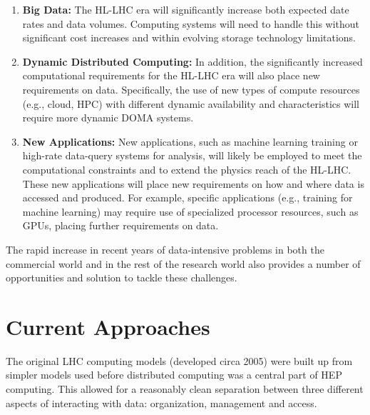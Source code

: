 \documentclass[12pt,a4paper]{article}
\begin{document}
\begin{enumerate}
\def\labelenumi{\arabic{enumi}.}
\item \textbf{Big Data:} The HL-LHC era will significantly increase both expected
  date rates and data volumes. Computing systems will need to
  handle this without significant cost increases and within evolving
  storage technology limitations.
\item \textbf{Dynamic Distributed Computing:} In addition, the significantly
  increased computational requirements for the HL-LHC era will also
  place new requirements on data. Specifically, the use of new types of
  compute resources (e.g., cloud, HPC) with different dynamic
  availability and characteristics will require more dynamic
  DOMA systems.
\item \textbf{New Applications:} New applications, such as machine learning
  training or high-rate data-query systems for analysis, will likely be
  employed to meet the computational constraints and to extend the
  physics reach of the HL-LHC. These new applications will place new
  requirements on how and where data is accessed and produced. For
  example, specific applications (e.g., training for machine learning)
  may require use of specialized processor resources, such as GPUs,
%
%
  placing further requirements on data.
\end{enumerate}

The rapid increase in recent years of data-intensive problems in both
the commercial world and in the rest of the research world also provides
a number of opportunities and solution to tackle these challenges.

\section{Current Approaches}\label{current-approaches}

The original LHC computing models (developed circa 2005) were built up from
simpler models used before distributed computing was a central part of
HEP computing. This allowed for a reasonably clean separation between
three different aspects of interacting with data: organization,
management and access.
\end{document}
